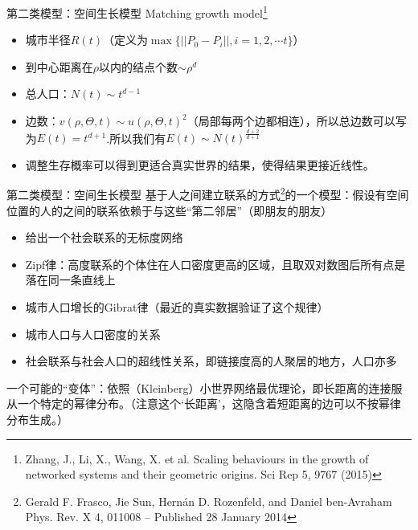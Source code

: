 \documentclass[utf8]{ctexbeamer}
\begin{document}
\begin{frame}{第二类模型：空间生长模型}
    Matching growth model\footnote{Zhang, J., Li, X., Wang, X. et al. Scaling behaviours in the growth of networked systems and their geometric origins. Sci Rep 5, 9767 (2015)}
    \begin{itemize}
        \item 城市半径\(R(t)\)（定义为\(\max\{||P_0-P_i||,i=1,2,\cdots t\}\)）
        \item 到中心距离在\(\rho\)以内的结点个数\(\sim \rho^d\)
        \item 总人口：$N(t)\sim t^{d-1}$
        \item 边数：\(v(\rho,\Theta,t)\sim u(\rho,\Theta,t)^2\)（局部每两个边都相连），所以总边数可以写为$E(t) = t^{d+1}$.所以我们有$E(t)\sim N(t)^{\frac{d+2}{d+1}}$
        \vspace{0.5cm}
        \item 调整生存概率可以得到更适合真实世界的结果，使得结果更接近线性。
    \end{itemize}
\end{frame}

\begin{frame}{第二类模型：空间生长模型}
    基于人之间建立联系的方式\footnote{Gerald F. Frasco, Jie Sun, Hernán D. Rozenfeld, and Daniel ben-Avraham
    Phys. Rev. X 4, 011008 – Published 28 January 2014}的一个模型：假设有空间位置的人的之间的联系依赖于与这些“第二邻居”（即朋友的朋友）
    \begin{itemize}
        \item 给出一个社会联系的无标度网络
        \item Zipf律：高度联系的个体住在人口密度更高的区域，且取双对数图后所有点是落在同一条直线上
        \item 城市人口增长的Gibrat律（最近的真实数据验证了这个规律）
        \item 城市人口与人口密度的关系
        \item 社会联系与社会人口的超线性关系，即链接度高的人聚居的地方，人口亦多
    \end{itemize}
    一个可能的“变体”：依照（Kleinberg）小世界网络最优理论，即长距离的连接服从一个特定的幂律分布。（注意这个‘长距离’，这隐含着短距离的边可以不按幂律分布生成。）
\end{frame}
\end{document}
